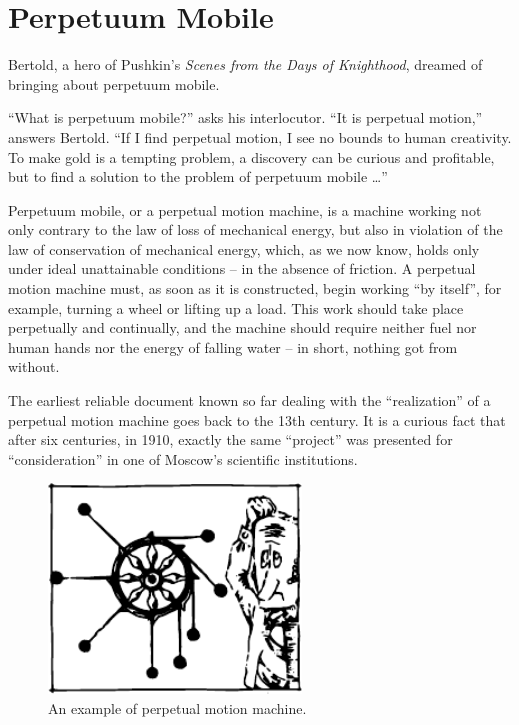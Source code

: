 \section{Perpetuum Mobile}

Bertold, a hero of Pushkin's \emph{Scenes from the Days of
Knighthood}, dreamed of bringing about perpetuum mobile.

``What is perpetuum mobile?'' asks his interlocutor. ``It
is perpetual motion,'' answers Bertold. ``If I find perpetual motion, I see no bounds to human creativity. To make gold is a tempting problem, a discovery can be curious and profitable, but to find a solution to the problem of perpetuum mobile \ldots{}''

Perpetuum mobile, or a perpetual motion machine, is
a machine working not only contrary to the law of loss of
mechanical energy, but also in violation of the law of
conservation of mechanical energy, which, as we now
know, holds only under ideal unattainable conditions -- in
the absence of friction. A perpetual motion machine must,
as soon as it is constructed, begin working ``by itself'',
for example, turning a wheel or lifting up a load. This
work should take place perpetually and continually, and
the machine should require neither fuel nor human hands
nor the energy of falling water -- in short, nothing got
from without.

The earliest reliable document known so far dealing
with the ``realization'' of a perpetual motion machine
goes back to the 13th century. It is a curious fact that
after six centuries, in 1910, exactly the same ``project''
was presented for ``consideration'' in one of Moscow's
scientific institutions.

\begin{figure}[!ht]
\centering
\includegraphics[width=0.6\textwidth]{figures/fig-03-07.pdf}
\caption{An example of perpetual motion machine.}
\label{fig-3.07}
\end{figure}

